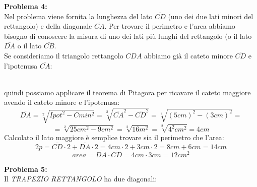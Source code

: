 \documentclass[14pt]{extarticle}
\begin{document}
\textbf{Problema 4:}\\
Nel problema viene fornita la lunghezza del lato \(\overline{CD}\) (uno dei due lati minori del rettangolo) e della diagonale \(\overline{CA}\). Per trovare il perimetro e l'area abbiamo bisogno di conoscere la misura di uno dei lati più lunghi del rettangolo (o il lato \(\overline{DA}\) o il lato \(\overline{CB}\).\\
Se consideriamo il triangolo rettangolo \(CDA\) abbiamo già il cateto minore \(\overline{CD}\) e l'ipotenusa \(\overline{CA}\):\\
\hspace{0.5cm}
\\
quindi possiamo applicare il teorema di Pitagora per ricavare il cateto maggiore avendo il cateto minore e l'ipotenusa:\\
\[\overline{DA}=\sqrt[2]{Ipot^2-Cmin^2}=\sqrt[2]{\overline{CA}^2-\overline{CD}^2}=\sqrt[2]{(5cm)^2-(3cm)^2}=\]\[=\sqrt[2]{25cm^2-9cm^2}=\sqrt[2]{16m^2}=\sqrt[2]{4^2cm^2}=4cm\]
Calcolato il lato maggiore è semplice trovare sia il perimetro che l'area:
\[2p=\overline{CD}\cdot2+\overline{DA}\cdot2=4cm\cdot2+3cm \cdot2=8cm+6cm=14cm\]
\[area=\overline{DA}\cdot\overline{CD}=4cm\cdot3cm=12cm^2\]

\textbf{Problema 5:}\\
Il \textit{TRAPEZIO RETTANGOLO} ha due diagonali:\\
\vspace{0.5cm}
\end{document}
